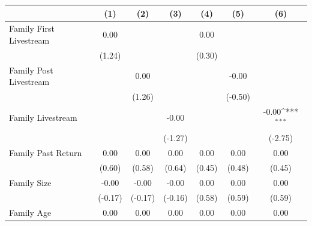 {
\def\sym#1{\ifmmode^{#1}\else\(^{#1}\)\fi}
\begin{tabular}{l*{6}{c}}
\toprule
                    &\multicolumn{1}{c}{(1)}         &\multicolumn{1}{c}{(2)}         &\multicolumn{1}{c}{(3)}         &\multicolumn{1}{c}{(4)}         &\multicolumn{1}{c}{(5)}         &\multicolumn{1}{c}{(6)}         \\
\midrule
Family First Livestream&        0.00         &                     &                     &        0.00         &                     &                     \\
                    &      (1.24)         &                     &                     &      (0.30)         &                     &                     \\
\addlinespace
Family Post Livestream&                     &        0.00         &                     &                     &       -0.00         &                     \\
                    &                     &      (1.26)         &                     &                     &     (-0.50)         &                     \\
\addlinespace
Family Livestream   &                     &                     &       -0.00         &                     &                     &       -0.00\sym{***}\\
                    &                     &                     &     (-1.27)         &                     &                     &     (-2.75)         \\
\addlinespace
Family Past Return  &        0.00         &        0.00         &        0.00         &        0.00         &        0.00         &        0.00         \\
                    &      (0.60)         &      (0.58)         &      (0.64)         &      (0.45)         &      (0.48)         &      (0.45)         \\
\addlinespace
Family Size         &       -0.00         &       -0.00         &       -0.00         &        0.00         &        0.00         &        0.00         \\
                    &     (-0.17)         &     (-0.17)         &     (-0.16)         &      (0.58)         &      (0.59)         &      (0.59)         \\
\addlinespace
Family Age          &        0.00         &        0.00         &        0.00         &        0.00         &        0.00         &        0.00         \\

\end{tabular}}
